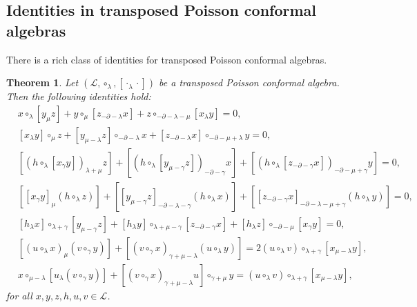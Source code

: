 \documentclass[11pt,letterpaper,reqno]{amsart}
\newtheorem{theorem}{Theorem}[section]
\theoremstyle{definition}
\numberwithin{equation}{section}
\begin{document}
\subsection{Identities in transposed Poisson conformal algebras}
There is a rich class of identities for transposed Poisson conformal algebras. %
\begin{theorem}
   Let $(\mathcal{L} ,\circ_\lambda,[{\cdot_ \lambda \cdot}])$ be a transposed Poisson conformal algebra. Then the following identities hold:
   \begin{align}
      &x\circ_{\lambda}[y_{\mu}z]+y\circ_{\mu}[z_{-\partial-\lambda}x]+z\circ_{-\partial-\lambda-\mu}[x_{\lambda}y]=0, \label{eqh}\\
      &[x_{\lambda}y]\circ_{\mu}z+[y_{\mu-\lambda}z]\circ_{-\partial-\lambda}x+[z_{-\partial-\lambda}x]\circ_{-\partial-\mu+\lambda}y=0, \label{eqw}\\
      &[(h\circ_{\lambda}[x_{\gamma}y])_{\lambda+\mu}z]+[(h\circ_{\lambda}[y_{\mu-\gamma}z])_{-\partial-\gamma}x]+[(h\circ_{\lambda}[z_{-\partial-\gamma}x])_{-\partial-\mu+\gamma}y]=0, \label{eqs}\\
      &[[x_{\gamma}y]_{\mu}(h\circ_{\lambda}z)]+[[y_{\mu-\gamma}z]_{-\partial-\lambda-\gamma}(h\circ_{\lambda}x)]+[[z_{-\partial-\gamma}x]_{-\partial-\lambda-\mu+\gamma}(h\circ_{\lambda}y)]=0, \label{equ}\\
      &[h_{\lambda}x]\circ_{\lambda+\gamma}[y_{\mu-\gamma}z]+[h_{\lambda}y]\circ_{\lambda+\mu-\gamma}[z_{-\partial-\gamma}x]+[h_{\lambda}z]\circ_{-\partial-\mu}[x_{\gamma}y]=0,  \label{eql}\\
      &[(u\circ_{\lambda}x)_{\mu}(v\circ_{\gamma}y)]+[(v\circ_{\gamma}x)_{\gamma+\mu-\lambda}(u\circ_{\lambda}y)]=2\left(u\circ_{\lambda}v\right)\circ_{\lambda+\gamma}[x_{\mu-\lambda}y], \label{ss1}\\
      &x\circ_{\mu-\lambda}[u_{\lambda}(v\circ_{\gamma}y)]+[(v\circ_{\gamma}x)_{\gamma+\mu-\lambda}u]\circ_{\gamma+\mu}y
      =\left(u\circ_{\lambda}v\right)\circ_{\lambda+\gamma}[x_{\mu-\lambda}y],\label{ss2}%
   \end{align}
   for all $x,y,z,h,u,v \in \mathcal{L}$.
\end{theorem}
\end{document}
